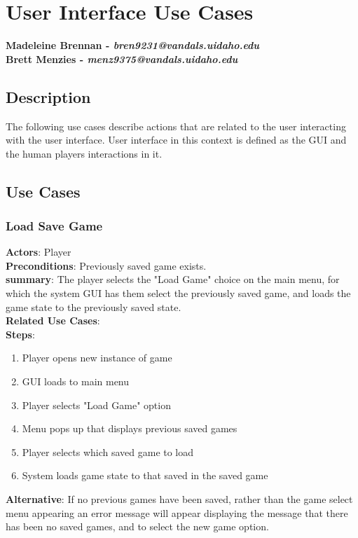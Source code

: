 \documentclass{report}
\begin{document}
\chapter{User Interface Use Cases}
\textbf{Madeleine Brennan  - \textit{bren9231@vandals.uidaho.edu} } \\
\textbf{Brett Menzies - \textit{menz9375@vandals.uidaho.edu} }

\section{Description}

The following use cases describe actions that are related to the user interacting with the user interface. User interface in this context is defined as the GUI and the human players interactions in it.


\section{Use Cases}
\subsection{Load Save Game}

\textbf{Actors}:
Player \\
\textbf{Preconditions}:
Previously saved game exists. \\
\textbf{summary}:
The player selects the "Load Game" choice on the main menu, for which the system GUI has them select the previously saved game, and loads the game state to the previously saved state. \\
\textbf{Related Use Cases}:\\
\textbf{Steps}:
\begin{enumerate}
\item Player opens new instance of game
\item GUI loads to main menu
\item Player selects "Load Game" option
\item Menu pops up that displays previous saved games
\item Player selects which saved game to load
\item System loads game state to that saved in the saved game
\end{enumerate}
\textbf{Alternative}:
If no previous games have been saved, rather than the game select menu appearing an error message will appear displaying the message that there has been no saved games, and to select the new game option.\\
\end{document}
